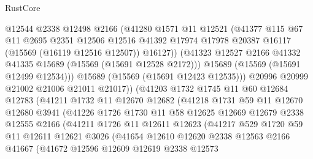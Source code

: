 \begin{lexlean}{RustCore}
\begin{coremodule}
                    @12544
                    @2338
                    @12498
                    @2166
                    (@41280
                      @1571
                      @11
                      @12521
                      (@41377
                        @115
                        @67
                        @11
                        @2695
                        @2351
                        @12506
                        @12516
                        @41392
                        @17974
                        @17978
                        @20387
                        @16117
                        (@15569 (@16119 @12516 @12507))
                        @16127))
                    (@41323 @12527 @2166 @41332 @41335 @15689 (@15569 (@15691 @12528 @2172)))
                    @15689
                    (@15569 (@15691 @12499 @12534)))
                  @15689
                  (@15569 (@15691 @12423 @12535)))
                @20996
                @20999
                @21002
                @21006
                @21011
                @21017))
            (@41203
              @1732
              @1745
              @11
              @60
              @12684
              @12783
              (@41211
                @1732
                @11
                @12670
                @12682
                (@41218
                  @1731
                  @59
                  @11
                  @12670
                  @12680
                  @3941
                  (@41226
                    @1726
                    @1730
                    @11
                    @58
                    @12625
                    @12669
                    @12679
                    @2338
                    @12555
                    @2166
                    (@41211
                      @1726
                      @11
                      @12611
                      @12623
                      (@41217
                        @529
                        @1720
                        @59
                        @11
                        @12611
                        @12621
                        @3026
                        (@41654
                          @12610
                          @12620
                          @2338
                          @12563
                          @2166
                          @41667
                          (@41672
                            @12596
                            @12609
                            @12619
                            @2338
                            @12573

\end{coremodule}
\end{lexlean}
